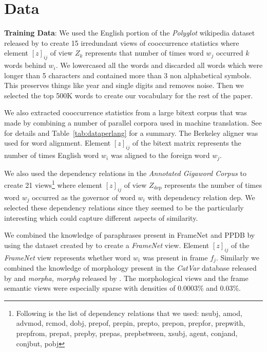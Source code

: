 \documentclass[11pt]{article}
\newcommand{\xline}[0]{\noindent\underline{\makebox[0.1cm][l]{}}}
\begin{document}
\section{Data}
\label{sec:data}
\textbf{Training Data}: We used the English portion of the \textit{Polyglot} wikipedia dataset
released by \cite{al2013polyglot} to create 15 irredundant views of
cooccurrence statistics where element $[z]_{ij}$ of view $Z_k$
represents that number of times word $w_j$ occurred $k$ words behind
$w_i$. We lowercased all the words and discarded all
words which were longer than 5 characters and contained more than 3 non
alphabetical symbols. This preserves things like year and single
digits and removes noise. Then we selected the top 500K words to
create our vocabulary for the rest of the paper.

We also extracted cooccurrence statistics from a large bitext corpus that was made by combining a
number of parallel corpora used in machine translation. See
\cite{ganitkevitch2013ppdb} for details and
Table~\ref{tab:dataperlang} for a summary.
The Berkeley aligner was used for word alignment. Element
$[z]_{ij}$ of the bitext matrix represents the number of times English
word $w_i$ was aligned to the foreign word $w_j$.

We also used the dependency relations in the \textit{Annotated Gigaword Corpus} to
create 21 views\footnote{Following is the list of dependency relations
  that we used:
nsubj, amod, advmod, rcmod, dobj, prep\xline{}of, prep\xline{}in,
prep\xline{}to, prep\xline{}on, prep\xline{}for, prep\xline{}with,
prep\xline{}from, prep\xline{}at, prep\xline{}by, prep\xline{}as,
prep\xline{}between, xsubj, agent, conj\xline{}and, conj\xline{}but, pobj} 
where element $[z]_{ij}$ of view 
$Z_{\textrm{dep}}$ represents the number of times word $w_j$ occurred as the
governor of word $w_i$ with dependency relation $\textrm{dep}$. We
selected these dependency relations since they seemed to be the
particularly interesting which could capture different aspects of
similarity.

We combined the knowledge of paraphrases present in FrameNet and PPDB by
using the dataset created by \cite{rastogi2014augmenting} to create a
\textit{FrameNet} view. Element $[z]_{ij}$ of the \textit{FrameNet}
view represents whether word $w_i$ was present in frame
$f_j$. Similarly we combined the knowledge of morphology present in
the \textit{CatVar} database released by \cite{habash2003catvar} and
\textit{morpha, morphg} released by \cite{minnen2001applied}.
The morphological views and the frame semantic views were especially
sparse with densities of 0.0003\% and 0.03\%.
\end{document}
